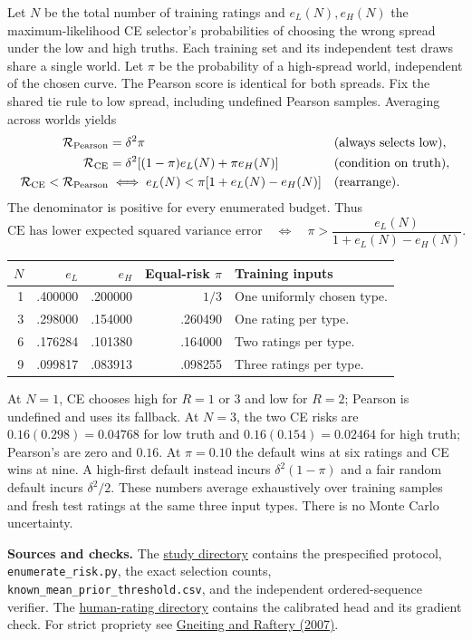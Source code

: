 \documentclass[11pt]{article}
\def\expurl{https://github.com/brando90/judges-dont-need-psychometrics-or-corr/tree/main/experiments/19_small_data_moment_recovery_open_and_closed_judges_start_21Nov2026}
\begin{document}
Let $N$ be the total number of training ratings and $e_L(N),e_H(N)$ the maximum-likelihood CE selector's probabilities of choosing the wrong spread under the low and high truths. Each training set and its independent test draws share a single world. Let $\pi$ be the probability of a high-spread world, independent of the chosen curve. The Pearson score is identical for both spreads. Fix the shared tie rule to low spread, including undefined Pearson samples. Averaging across worlds yields
\begin{align*}
\mathcal R_{\rm Pearson}&=\delta^2\pi &&\text{(always selects low)},\\
\mathcal R_{\rm CE}&=\delta^2[(1-\pi)e_L(N)+\pi e_H(N)]
    &&\text{(condition on truth)},\\
\mathcal R_{\rm CE}<\mathcal R_{\rm Pearson}
 &\iff e_L(N)<\pi[1+e_L(N)-e_H(N)] &&\text{(rearrange).}
\end{align*}
The denominator is positive for every enumerated budget. Thus
\[
\boxed{\text{CE has lower expected squared variance error}\quad\iff\quad
  \pi>\frac{e_L(N)}{1+e_L(N)-e_H(N)}.}
\]
\begin{tabularx}{\linewidth}{@{}r r r r X@{}}
\toprule $N$ & $e_L$ & $e_H$ & Equal-risk $\pi$ & Training inputs\\ \midrule
1 & .400000 & .200000 & $1/3$ & One uniformly chosen type.\\
3 & .298000 & .154000 & .260490 & One rating per type.\\
6 & .176284 & .101380 & .164000 & Two ratings per type.\\
9 & .099817 & .083913 & .098255 & Three ratings per type.\\
\bottomrule
\end{tabularx}

At $N=1$, CE chooses high for $R=1$ or 3 and low for $R=2$; Pearson is undefined and uses its fallback. At $N=3$, the two CE risks are $0.16(0.298)=0.04768$ for low truth and $0.16(0.154)=0.02464$ for high truth; Pearson's are zero and $0.16$. At $\pi=0.10$ the default wins at six ratings and CE wins at nine. A high-first default instead incurs $\delta^2(1-\pi)$ and a fair random default incurs $\delta^2/2$. These numbers average exhaustively over training samples and fresh test ratings at the same three input types. There is no Monte Carlo uncertainty.

\textbf{Sources and checks.} The \href{\expurl/theory_simulation}{study directory} contains the prespecified protocol, \texttt{enumerate\_risk.py}, the exact selection counts, \texttt{known\_mean\_prior\_threshold.csv}, and the independent ordered-sequence verifier. The \href{\expurl/human_judges}{human-rating directory} contains the calibrated head and its gradient check. For strict propriety see \href{https://doi.org/10.1198/016214506000001437}{Gneiting and Raftery (2007)}.
\end{document}
